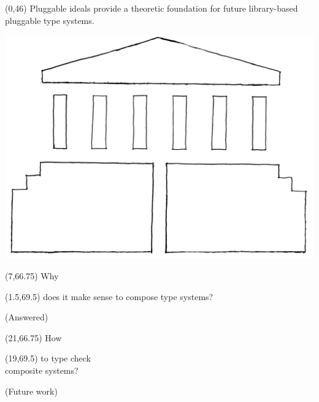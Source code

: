 \documentclass[a0]{a0poster}
\def\FONTSIZE#1{\fontsize{#1}{#1}\selectfont}
\def\BLOCK{\FONTSIZE{40}}
\def\LESSHEAD#1{{\FONTSIZE{64}#1}}
\begin{document}
\begin{textblock}{30}(0,46)
Pluggable ideals provide a theoretic foundation for future
library-based  pluggable type systems.

\vspace{1cm}
\includegraphics[width=33cm]{library.png}
\end{textblock}

\begin{textblock}{15}(7,66.75)
\LESSHEAD{Why}
\end{textblock}

\begin{textblock}{15}(1.5,69.5)
\BLOCK
does it make sense to compose type systems?
\par\vspace{0.5cm}\hspace{3cm}
(Answered)
\end{textblock}

\begin{textblock}{15}(21,66.75)
\LESSHEAD{How}
\end{textblock}

\begin{textblock}{15}(19,69.5)
\BLOCK
to type check\\ composite systems?
\par\vspace{0.5cm}\hspace{1cm}
(Future work)
\end{textblock}
\end{document}
